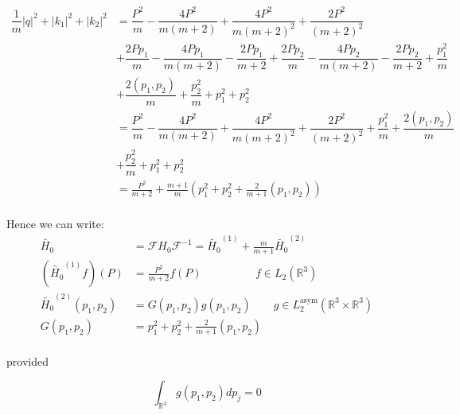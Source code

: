 \documentclass[11pt, a4paper, german]{article}
\theoremstyle{plain}
\theoremstyle{definition}
\theoremstyle{remark}
\numberwithin{equation}{section}
\numberwithin{theorem}{section}
\begin{document}
\begin{align*}
\dfrac{1}{m} \left| q \right| ^{2} + \left| k _{1} \right| ^{2} + \left| k _{2} \right| ^{2} &=
\dfrac{P ^{2} }{m} - \dfrac{4 P ^{2} }{m \left( m+2 \right) } + \dfrac{4 P ^{2} }{m \left( m+2 \right) ^2 } + \dfrac{2 P ^2 }{\left( m+2 \right) ^2 } \\&+ \dfrac{2 P p _{1} }{m} - \dfrac{4 P p _{1} }{m \left( m+2 \right) } - \dfrac{2 P p _{1} }{m+2} + \dfrac{2 P p _{2} }{m} - \dfrac{4 P p _{2} }{m \left( m+2 \right) } - \dfrac{2 P p _{2} }{m+2} + \dfrac{p _{1} ^2 }{m} \\&+ \dfrac{2 \left( p _{1} , p _{2} \right) }{m} + \dfrac{p _{2} ^2 }{m} + p _{1} ^2 + p _{2} ^2 \\&= \dfrac{P ^{2} }{m} - \dfrac{4 P ^{2} }{m \left( m+2 \right) } + \dfrac{4 P ^{2} }{m \left( m+2 \right) ^2 } + \dfrac{2 P ^2 }{\left( m+2 \right) ^2 } + \dfrac{p _{1} ^2 }{m} + \dfrac{2 \left( p _{1} , p _{2} \right) }{m} \\&+ \dfrac{p _{2} ^2 }{m} + p _{1} ^2 + p _{2} ^2 \\&= \frac{P ^{2} }{m+2} + \frac{m+1}{m} \left( p _{1} ^2 + p _{2} ^2 + \frac{2}{m+1} \left( p _{1} , p _{2} \right) \right)
\end{align*}\\

Hence we can write: 
\begin{align}
\widetilde{H _{0} } &= \mathcal{F} H _{0} \mathcal{F}^{-1} = \widetilde{H _{0} } ^{\left( 1 \right) } + \frac{m}{m+1} \widetilde{H _{0} } ^{\left( 2 \right) }\\
\left( \widetilde{H _{0} } ^{\left( 1 \right) } f \right) \left( P \right) &= \frac{P ^{2} }{m+2} f \left( P \right)\,\,\,\,\,\,\,\,\,\,\,\,\,\,\,\,\,\,\,\,\,\,\,\,\,\,\,\,\,f\in L _{2} \left( \mathbb{R}^{3} \right)\\
\widetilde{H _{0} } ^{\left( 2 \right) } \left( p _{1} , p _{2} \right) &= G \left( p _{1} , p _{2} \right) g \left( p _{1} , p _{2} \right) \,\,\,\,\,\,\,\,\,\,\,\,g \in L _{2} ^{\text{asym} } \left( \mathbb{R}^{3} \times \mathbb{R}^{3} \right)\\
G \left( p _{1} , p _{2} \right) &= p _{1} ^2 + p _{2} ^2 + \frac{2}{m+1} \left( p _{1} , p _{2} \right) \\
\end{align}

provided

\begin{equation*}
\int_{\mathbb{R}^{3} } g \left( p _{1} , p _{2} \right) dp _{j} = 0
\end{equation*}
\end{document}
